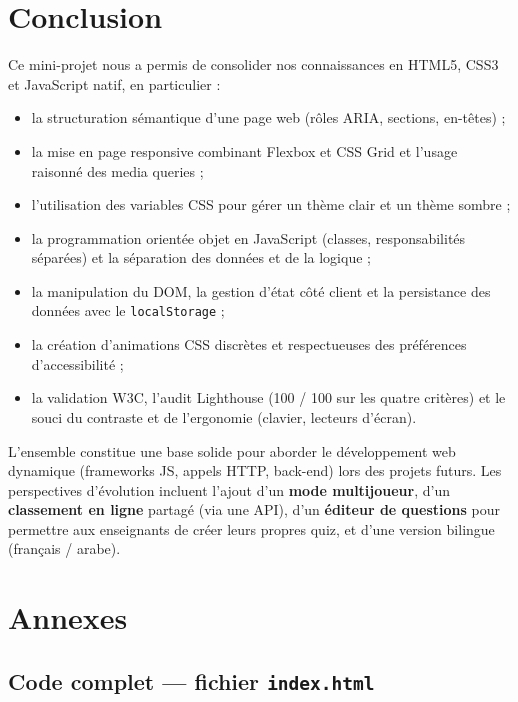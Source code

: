 \documentclass[11pt,a4paper]{article}
\begin{document}
\clearpage
\section{Conclusion}
Ce mini-projet nous a permis de consolider nos connaissances en HTML5, CSS3 et
JavaScript natif, en particulier :
\begin{itemize}
  \item la structuration sémantique d'une page web (rôles ARIA, sections, en-têtes) ;
  \item la mise en page responsive combinant Flexbox et CSS Grid et l'usage raisonné des
        media queries ;
  \item l'utilisation des variables CSS pour gérer un thème clair et un thème sombre ;
  \item la programmation orientée objet en JavaScript (classes, responsabilités séparées)
        et la séparation des données et de la logique ;
  \item la manipulation du DOM, la gestion d'état côté client et la persistance des
        données avec le \texttt{localStorage} ;
  \item la création d'animations CSS discrètes et respectueuses des préférences
        d'accessibilité ;
  \item la validation W3C, l'audit Lighthouse (100 / 100 sur les quatre critères) et le
        souci du contraste et de l'ergonomie (clavier, lecteurs d'écran).
\end{itemize}

L'ensemble constitue une base solide pour aborder le développement web dynamique
(frameworks JS, appels HTTP, back-end) lors des projets futurs. Les perspectives
d'évolution incluent l'ajout d'un \textbf{mode multijoueur}, d'un \textbf{classement en
ligne} partagé (via une API), d'un \textbf{éditeur de questions} pour permettre aux
enseignants de créer leurs propres quiz, et d'une version bilingue (français / arabe).

\clearpage
\appendix
\section{Annexes}
\subsection{Code complet --- fichier \texttt{index.html}}

\end{document}

